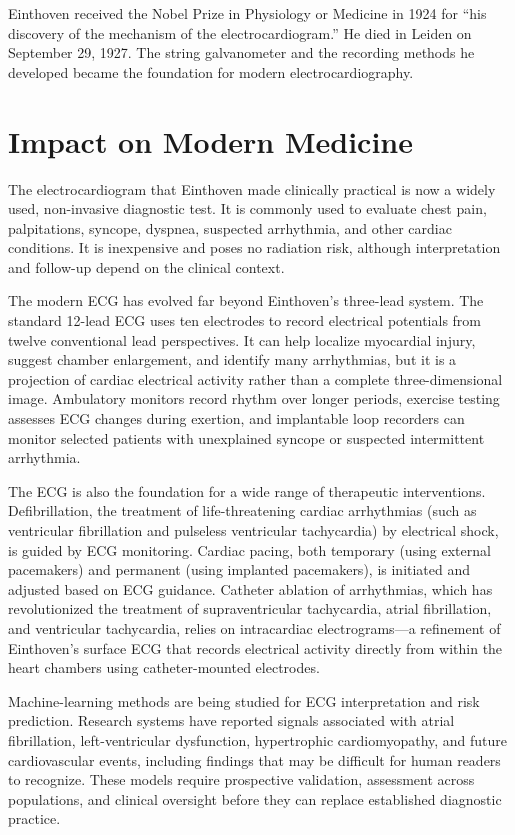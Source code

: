 Einthoven received the Nobel Prize in Physiology or Medicine in 1924 for ``his discovery of the mechanism of the electrocardiogram.'' He died in Leiden on September 29, 1927. The string galvanometer and the recording methods he developed became the foundation for modern electrocardiography.\cite{nobel-1924,einthoven-biographical}

\section{Impact on Modern Medicine}

The electrocardiogram that Einthoven made clinically practical is now a widely used, non-invasive diagnostic test. It is commonly used to evaluate chest pain, palpitations, syncope, dyspnea, suspected arrhythmia, and other cardiac conditions. It is inexpensive and poses no radiation risk, although interpretation and follow-up depend on the clinical context.

The modern ECG has evolved far beyond Einthoven's three-lead system. The standard 12-lead ECG uses ten electrodes to record electrical potentials from twelve conventional lead perspectives. It can help localize myocardial injury, suggest chamber enlargement, and identify many arrhythmias, but it is a projection of cardiac electrical activity rather than a complete three-dimensional image. Ambulatory monitors record rhythm over longer periods, exercise testing assesses ECG changes during exertion, and implantable loop recorders can monitor selected patients with unexplained syncope or suspected intermittent arrhythmia.

The ECG is also the foundation for a wide range of therapeutic interventions. Defibrillation, the treatment of life-threatening cardiac arrhythmias (such as ventricular fibrillation and pulseless ventricular tachycardia) by electrical shock, is guided by ECG monitoring. Cardiac pacing, both temporary (using external pacemakers) and permanent (using implanted pacemakers), is initiated and adjusted based on ECG guidance. Catheter ablation of arrhythmias, which has revolutionized the treatment of supraventricular tachycardia, atrial fibrillation, and ventricular tachycardia, relies on intracardiac electrograms---a refinement of Einthoven's surface ECG that records electrical activity directly from within the heart chambers using catheter-mounted electrodes.

Machine-learning methods are being studied for ECG interpretation and risk prediction. Research systems have reported signals associated with atrial fibrillation, left-ventricular dysfunction, hypertrophic cardiomyopathy, and future cardiovascular events, including findings that may be difficult for human readers to recognize. These models require prospective validation, assessment across populations, and clinical oversight before they can replace established diagnostic practice.

